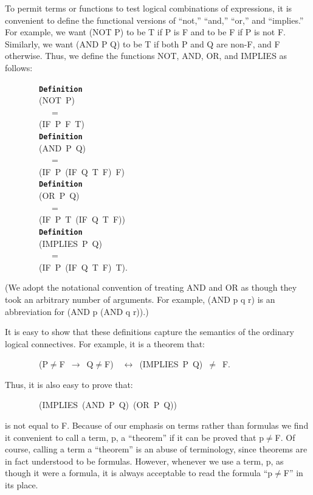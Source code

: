 \documentclass[11pt]{book}
\newenvironment{pubasis}{\begin{flushleft}\ttfamily\small}{\normalsize\rmfamily\end{flushleft}}
\newcommand{\axiomordefinition}[1]{\vspace{6pt}\texttt{\textbf{#1}}}
\begin{document}
To permit terms or functions to test logical combinations of expressions,
it is convenient to define the functional versions of ``not,'' ``and,'' ``or,'' and ``implies.''
For example, we want (NOT P) to be T if P is F and
to be F if P is not F.  Similarly, we want (AND P Q) to be T if both P and Q
are non-F, and F otherwise.
Thus, we define the functions NOT, AND, OR, and IMPLIES as follows:
\begin{pubasis}
~~~~~~~~\axiomordefinition{Definition}\\
~~~~~~~~(NOT~P)\\
~~~~~~~~~~~=\\
~~~~~~~~(IF~P~F~T)\\

~~~~~~~~\axiomordefinition{Definition}\\
~~~~~~~~(AND~P~Q)\\
~~~~~~~~~~~=\\
~~~~~~~~(IF~P~(IF~Q~T~F)~F)\\

~~~~~~~~\axiomordefinition{Definition}\\
~~~~~~~~(OR~P~Q)\\
~~~~~~~~~~~=\\
~~~~~~~~(IF~P~T~(IF~Q~T~F))\\

~~~~~~~~\axiomordefinition{Definition}\\
~~~~~~~~(IMPLIES~P~Q)\\
~~~~~~~~~~~=\\
~~~~~~~~(IF~P~(IF~Q~T~F)~T).\\
\end{pubasis}
(We adopt the notational convention of treating AND and OR as
though they took an arbitrary number of arguments.  For example,
(AND p q r) is an abbreviation for (AND p (AND q r)).)

It is easy to show that these definitions capture the semantics
of the ordinary logical
connectives.  For example, it is a theorem that:
\begin{pubasis}
~~~~~~~~(P$\neq$F~$\rightarrow$~Q$\neq$F)~~$\leftrightarrow$~(IMPLIES~P~Q)~$\neq$~F.\\
\end{pubasis}
Thus, it is also easy to prove that:
\begin{pubasis}
~~~~~~~~(IMPLIES~(AND~P~Q)~(OR~P~Q))\\
\end{pubasis}
is not equal to F.
Because of our emphasis on terms rather than formulas we find it
convenient to call a term, p, a ``theorem'' if it can be proved
that p$\neq$F.  Of course, calling a
term a ``theorem'' is an abuse of terminology, since
theorems are in fact understood to be formulas.
However, whenever we use a term, p,
as though it were a formula, it is always acceptable to read the formula ``p$\neq$F'' in its place.
\end{document}
